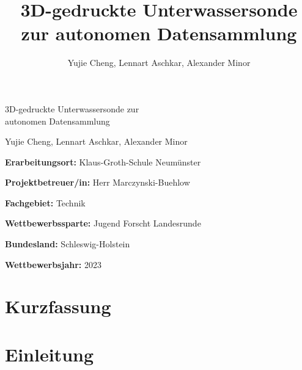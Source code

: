 \documentclass[11pt]{article}
\title{\Large{\textbf{3D-gedruckte Unterwassersonde zur autonomen Datensammlung}}}
\author{Yujie Cheng, Lennart Aschkar, Alexander Minor}
\begin{document}
\begin{titlepage}
  \begin{center}
    \vspace*{3cm}

    {\LARGE{3D-gedruckte Unterwassersonde zur \\ autonomen Datensammlung}}

    \vspace{0.5cm}
    {\normalsize{Yujie Cheng, Lennart Aschkar, Alexander Minor}}

    \vspace{3.5cm}

    \raggedright{\textbf{Erarbeitungsort:} Klaus-Groth-Schule Neumünster} \\
    \vspace{0.2cm}
    \raggedright{\textbf{Projektbetreuer/in:} Herr Marczynski-Buehlow} \\
    \vspace{0.2cm}
    \raggedright{\textbf{Fachgebiet:} Technik} \\
    \vspace{0.2cm}
    \raggedright{\textbf{Wettbewerbssparte:} Jugend Forscht Landesrunde} \\
    \vspace{0.2cm}
    \raggedright{\textbf{Bundesland:} Schleswig-Holstein} \\
    \vspace{0.2cm}
    \raggedright{\textbf{Wettbewerbsjahr:} 2023} \\

  \end{center}
\end{titlepage}

\newpage
\tableofcontents

\newpage
\section{Kurzfassung}
\noindent
\Kurzfassung

\newpage
\section{Einleitung}
\noindent
\Einleitung
\end{document}
